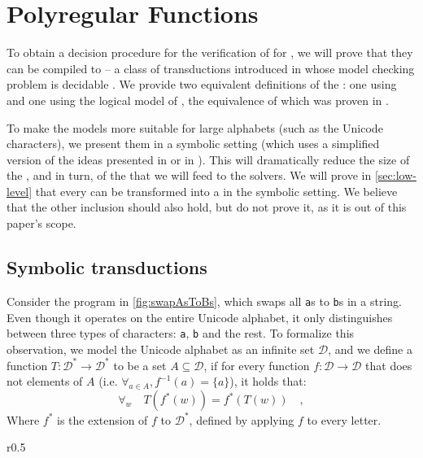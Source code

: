 \section{Polyregular Functions}
\label{sec:polyregular}

To obtain a decision procedure for the verification of  for
, we will 
prove that they can be compiled to  -- 
a class of transductions introduced in \cite{bojanczyk2018polyregular} whose model checking 
problem is decidable \cite[Theorem~1.7]{bojanczyk2018polyregular}. 
We provide two equivalent definitions of the : one using  \cite[p.
19]{bojanczyk2018polyregular} and one using the logical model of
 \cite[Definition
4]{bojanczyk2019string}, the equivalence of which 
was proven in
\cite{bojanczyk2018polyregular}.

To make the models more suitable for large alphabets (such as the Unicode
characters), we present them in a symbolic setting (which uses a simplified
version of the ideas presented in \cite{d2017power} or in
\cite[Section~3.1]{bojanczyk2023growth}). This will dramatically reduce the
size of the , and in turn, of
the  that we will feed to the solvers. We will prove in
\cref{sec:low-level} that every  can be
transformed into a  in the
symbolic setting. We believe that the other inclusion should also hold,
but do not prove it, as it is out of this paper's scope.


\subsection{Symbolic transductions}

\AP
Consider the program in \cref{fig:swapAsToBs}, which swaps all \texttt{a}s to
\texttt{b}s in a string. Even though it operates on the entire Unicode
alphabet, it only distinguishes between three types of characters: \texttt{a},
\texttt{b} and the rest.
To formalize this observation, we model the Unicode alphabet as an infinite set $\mathcal{D}$, and
we define a function $T : \mathcal{D}^* \to \mathcal{D}^*$ to be
 a set $A \subseteq \mathcal{D}$, if for every function $f:
\mathcal{D} \to \mathcal{D}$ that does not  elements of $A$ (i.e.
$\forall_{a\in A}, f^{-1}(a) = \{a\}$), it holds that:
\begin{equation*}
    \forall_{w} \quad T(f^*(w)) = f^*(T(w)) \quad ,
\end{equation*}
Where $f^*$ is the extension of $f$ to $\mathcal{D}^*$, defined by applying $f$
to every letter.
\begin{wrapfigure}{r}{0.5\textwidth}
    
    \caption{The \texttt{swapAsToBs} program.}
    \label{fig:swapAsToBs}
\end{wrapfigure}

